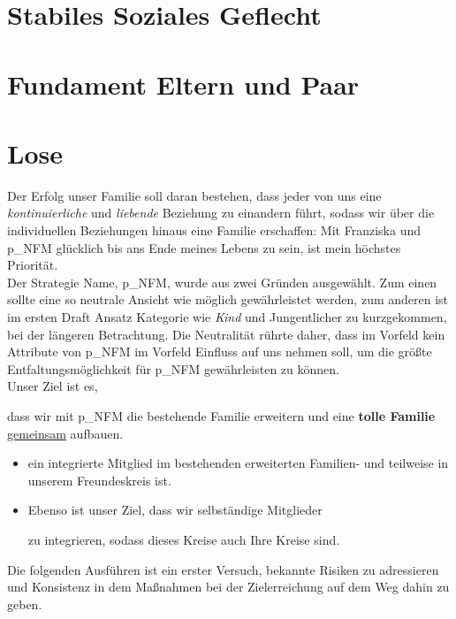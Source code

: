 \begin{itemize}
\section{Stabiles Soziales Geflecht}
\section{Fundament Eltern und Paar}





\section{Lose}
Der Erfolg unser Familie soll daran bestehen, dass jeder von uns eine \textit{kontinuierliche} und \textit{liebende} Beziehung zu einandern führt, sodass wir über die individuellen Beziehungen hinaus eine Familie erschaffen: Mit Franziska und \gls{p_NFM} glücklich bis ans Ende meines Lebens zu sein, ist mein höchstes Priorität.\\

Der Strategie Name, \gls{p_NFM}, wurde aus zwei Gründen ausgewählt. Zum einen sollte eine so neutrale Ansicht wie möglich gewährleistet werden, zum anderen ist im ersten Draft Ansatz Kategorie wie \textit{Kind} und Jungentlicher zu kurzgekommen, bei der längeren Betrachtung. Die Neutralität rührte daher, dass im Vorfeld kein Attribute von \gls{p_NFM} im Vorfeld Einfluss auf uns nehmen soll, um die größte Entfaltungsmöglichkeit für \gls{p_NFM} gewährleisten zu können.\\


Unser Ziel ist es,
\begin{center}
dass wir mit \gls{p_NFM} die bestehende Familie erweitern und eine \textbf{tolle Familie} \underline{gemeinsam} aufbauen.	
\end{center}


\begin{itemize}
	\item ein integrierte Mitglied im bestehenden  erweiterten Familien- und teilweise in unserem Freundeskreis ist.
	\item Ebenso ist unser Ziel, dass wir selbständige Mitglieder  
	
	zu integrieren, sodass dieses Kreise auch Ihre Kreise sind.
\end{itemize}

Die folgenden Ausführen ist ein erster Versuch, bekannte Risiken zu adressieren und  Konsistenz in dem Maßnahmen bei der Zielerreichung auf dem Weg dahin zu geben.



\end{itemize}
